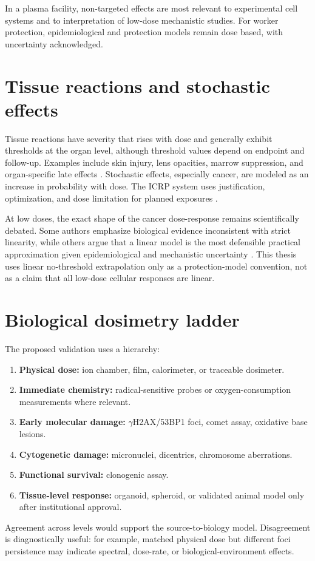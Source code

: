 In a plasma facility, non-targeted effects are most relevant to experimental cell systems and to interpretation of low-dose mechanistic studies. For worker protection, epidemiological and protection models remain dose based, with uncertainty acknowledged.

\section{Tissue reactions and stochastic effects}

Tissue reactions have severity that rises with dose and generally exhibit thresholds at the organ level, although threshold values depend on endpoint and follow-up. Examples include skin injury, lens opacities, marrow suppression, and organ-specific late effects \cite{icrp118}. Stochastic effects, especially cancer, are modeled as an increase in probability with dose. The ICRP system uses justification, optimization, and dose limitation for planned exposures \cite{icrp103,iaeaGSR3}.

At low doses, the exact shape of the cancer dose-response remains scientifically debated. Some authors emphasize biological evidence inconsistent with strict linearity, while others argue that a linear model is the most defensible practical approximation given epidemiological and mechanistic uncertainty \cite{tubiana2009,little2009,beir2006,unscear2020}. This thesis uses linear no-threshold extrapolation only as a protection-model convention, not as a claim that all low-dose cellular responses are linear.

\section{Biological dosimetry ladder}

The proposed validation uses a hierarchy:
\begin{enumerate}
\item \textbf{Physical dose:} ion chamber, film, calorimeter, or traceable dosimeter.
\item \textbf{Immediate chemistry:} radical-sensitive probes or oxygen-consumption measurements where relevant.
\item \textbf{Early molecular damage:} $\gamma$H2AX/53BP1 foci, comet assay, oxidative base lesions.
\item \textbf{Cytogenetic damage:} micronuclei, dicentrics, chromosome aberrations.
\item \textbf{Functional survival:} clonogenic assay.
\item \textbf{Tissue-level response:} organoid, spheroid, or validated animal model only after institutional approval.
\end{enumerate}
Agreement across levels would support the source-to-biology model. Disagreement is diagnostically useful: for example, matched physical dose but different foci persistence may indicate spectral, dose-rate, or biological-environment effects.

